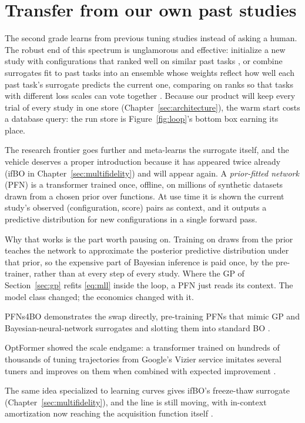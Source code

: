 \section{Transfer from our own past studies}

The second grade learns from previous tuning studies instead of asking a
human. The robust end of this spectrum is unglamorous and effective:
initialize a new study with configurations that ranked well on similar
past tasks \citep{feurer2015metalearning}, or combine surrogates fit to
past tasks into an ensemble whose weights reflect how well each past
task's surrogate predicts the current one, comparing on ranks so that
tasks with different loss scales can vote together
\citep{feurer2018rgpe}. Because our product will keep every trial of
every study in one store (Chapter~\ref{sec:architecture}), the warm
start costs a database query: the run store is Figure~\ref{fig:loop}'s
bottom box earning its place.

The research frontier goes further and meta-learns the surrogate itself,
and the vehicle deserves a proper introduction because it has appeared
twice already (ifBO in Chapter~\ref{sec:multifidelity}) and will appear
again. A \emph{prior-fitted network} (PFN) is a transformer trained once,
offline, on millions of synthetic datasets drawn from a chosen prior over
functions. At use time it is shown the current study's observed
(configuration, score) pairs as context, and it outputs a predictive
distribution for new configurations in a single forward pass.

Why that works is the part worth pausing on. Training on draws from
the prior teaches the network to approximate the posterior predictive
distribution under that prior, so the expensive part of Bayesian
inference is paid once, by the pre-trainer, rather than at every step
of every study. Where the GP of Section~\ref{sec:gp} refits
\eqref{eq:mll} inside the loop, a PFN just reads its context. The
model class changed; the economics changed with it.

PFNs4BO demonstrates the swap directly, pre-training PFNs that mimic
GP and Bayesian-neural-network surrogates and slotting them into
standard BO \citep{muller2023pfns4bo}.

OptFormer showed the scale endgame: a transformer trained on hundreds
of thousands of tuning trajectories from Google's Vizier service
imitates several tuners and improves on them when combined with
expected improvement \citep{chen2022optformer}.

The same idea specialized to learning curves gives ifBO's freeze-thaw
surrogate (Chapter~\ref{sec:multifidelity}), and the line is still
moving, with in-context amortization now reaching the acquisition
function itself \citep{rakotoarison2026alphapfn}.


